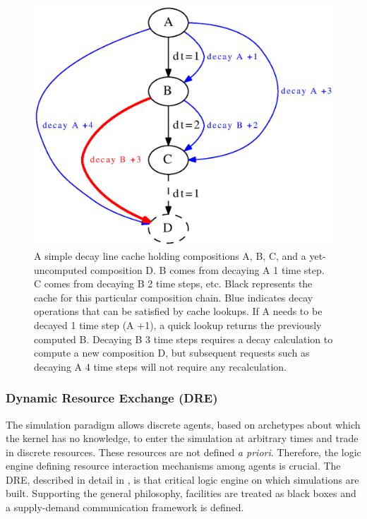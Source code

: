 \begin{figure}[htbp]
\begin{center}
\includegraphics[width=\columnwidth]{./images/compositions}
\end{center}
\caption{
A simple decay line cache holding compositions A, B, C, and a
yet-uncomputed composition D.  B comes from decaying A 1 time step.  C comes
from decaying B 2 time steps, etc.  Black represents the cache for this
particular composition chain. Blue indicates decay operations that can be
satisfied by cache lookups.   If A needs to be decayed 1 time step (A +1), a
quick lookup returns the previously computed B.  Decaying B 3 time steps
requires a decay calculation to compute a new composition D, but subsequent
requests such as decaying A 4 time steps will not require any recalculation.
}
\label{fig:compositions}
\end{figure}


\subsubsection{Dynamic Resource Exchange (DRE)}

The \Cyclus simulation paradigm allows discrete agents, based on archetypes
about which the kernel has no knowledge, to enter the simulation at arbitrary
times and trade in discrete resources. These resources are not defined \textit{a
  priori}. Therefore, the logic engine defining resource interaction mechanisms
among agents is crucial. The \gls{DRE}, described in detail in
\cite{gidden_agent-based_2015}, is that critical logic engine on which \Cyclus
simulations are built.  Supporting the general \Cyclus philosophy, facilities
are treated as black boxes and a supply-demand communication framework is
defined.

